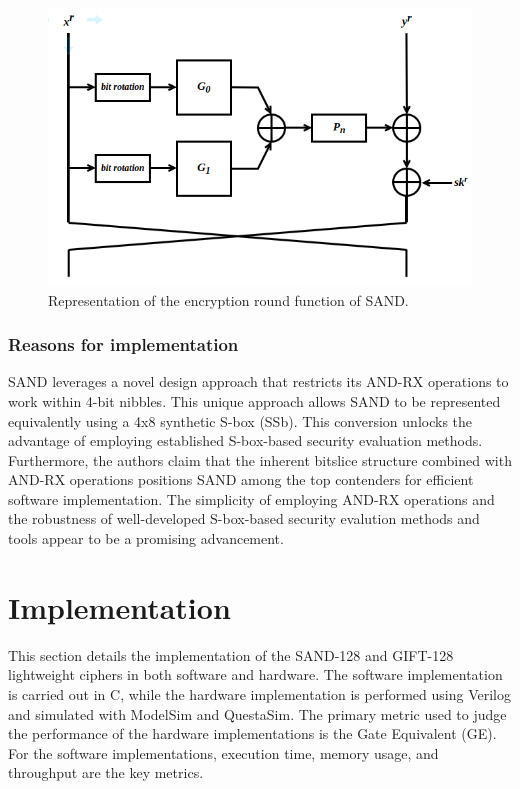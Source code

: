 \documentclass[conference]{IEEEtran}
\begin{document}
\begin{figure}
    \centering
    \includegraphics[width=0.9\columnwidth]{figures/SAND-ROUND.png}
    \caption{Representation of the encryption round function of SAND\cite{SAND}.}
    \label{fig:SAND-}
\end{figure}


\subsubsection{Reasons for implementation}
SAND leverages a novel design approach that restricts its AND-RX operations to work within 4-bit nibbles. This unique approach allows SAND to be represented equivalently using a 4x8 synthetic S-box (SSb). This conversion unlocks the advantage of employing established S-box-based security evaluation methods. Furthermore, the authors claim that the inherent bitslice structure combined with AND-RX operations positions SAND among the top contenders for efficient software implementation. The simplicity of employing AND-RX operations and the robustness of well-developed S-box-based security evalution methods and tools appear to be a promising advancement.

\section{Implementation}

This section details the implementation of the SAND-128 and GIFT-128 lightweight ciphers in both software and hardware. The software implementation is carried out in C, while the hardware implementation is performed using Verilog and simulated with ModelSim and QuestaSim. The primary metric used to judge the performance of the hardware implementations is the Gate Equivalent (GE). For the software implementations, execution time, memory usage, and throughput are the key metrics.
\end{document}
